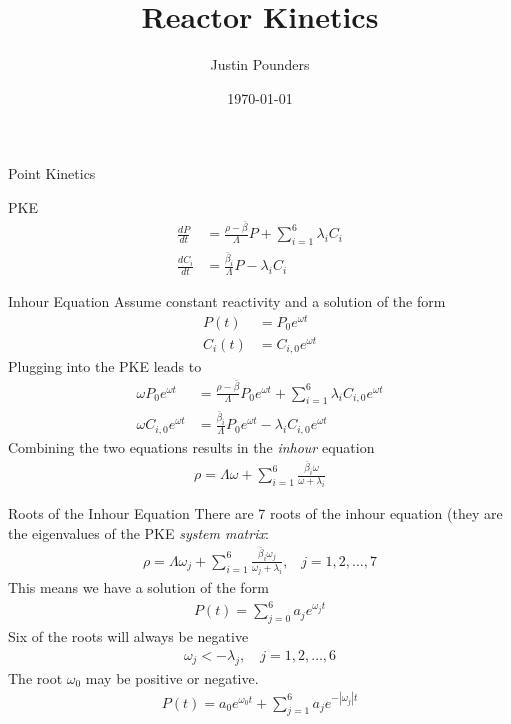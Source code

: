 \documentclass[presentation]{beamer}
\author{Justin Pounders}
\date{\today}
\title{Reactor Kinetics}
\begin{document}
\maketitle

\begin{frame}[label={sec:orgheadline1}]{Point Kinetics}
\begin{block}{PKE}
\begin{align*}
  \frac{dP}{dt} &= \frac{\rho - \bar{\beta}}{\Lambda}P + \sum_{i=1}^6 \lambda_i C_i \\
  \frac{dC_i}{dt} &= \frac{\bar{\beta}_i}{\Lambda} P - \lambda_i C_i
\end{align*}
\end{block}
\end{frame}
\begin{frame}[label={sec:orgheadline2}]{Inhour Equation}
Assume constant reactivity and a solution of the form
\begin{align*}
  P(t) &= P_0 e^{\omega t} \\
  C_i(t) &= C_{i,0} e^{\omega t}
\end{align*}
\pause
Plugging into the PKE leads to
\begin{align*}
  \omega P_0 e^{\omega t}  &= \frac{\rho - \bar{\beta}}{\Lambda}P_0 e^{\omega t}  + \sum_{i=1}^6 \lambda_i C_{i,0} e^{\omega t} \\
  \omega C_{i,0} e^{\omega t} &= \frac{\bar{\beta}_i}{\Lambda} P_0 e^{\omega t}  - \lambda_i C_{i,0} e^{\omega t}
\end{align*}
\pause
Combining the two equations results in the \emph{inhour} equation
\begin{align*}
  \rho = \Lambda \omega + \sum_{i=1}^6 \frac{\bar{\beta}_i \omega}{\omega + \lambda_i}
\end{align*}
\end{frame}
\begin{frame}[label={sec:orgheadline3}]{Roots of the Inhour Equation}
There are 7 roots of the inhour equation (they are the eigenvalues of the PKE \emph{system matrix}:
\begin{align*}
  \rho = \Lambda \omega_j + \sum_{i=1}^6 \frac{\bar{\beta}_i \omega_j}{\omega_j + \lambda_i}, \;\;\; j = 1,2,\hdots, 7
\end{align*}
\pause
This means we have a solution of the form
\begin{align*}
  P(t) = \sum_{j=0}^6 a_j e^{\omega_j t}
\end{align*}
Six of the roots will always be negative
\begin{align*}
  \omega_j < -\lambda_j, \quad j=1,2,\hdots, 6
\end{align*}
The root \(\omega_{\text{0}}\) may be positive or negative.
\begin{align*}
  P(t) = a_0 e^{\omega_0 t} + \sum_{j=1}^6 a_j e^{-|\omega_j| t}
\end{align*}
\end{frame}
\end{document}
